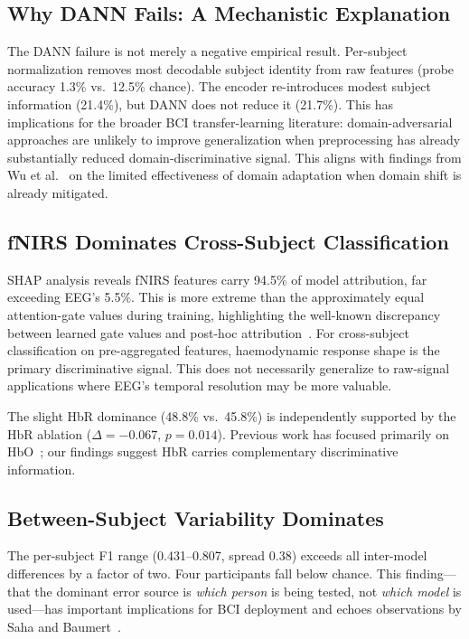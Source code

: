 \documentclass[conference]{IEEEtran}
\begin{document}
\subsection{Why DANN Fails: A Mechanistic Explanation}
The DANN failure is not merely a negative empirical result. Per-subject normalization removes most decodable subject identity from raw features (probe accuracy 1.3\% vs.\ 12.5\% chance). The encoder re-introduces modest subject information (21.4\%), but DANN does not reduce it (21.7\%). This has implications for the broader BCI transfer-learning literature: domain-adversarial approaches are unlikely to improve generalization when preprocessing has already substantially reduced domain-discriminative signal. This aligns with findings from Wu et al.~\cite{wu2022transfer} on the limited effectiveness of domain adaptation when domain shift is already mitigated.

\subsection{fNIRS Dominates Cross-Subject Classification}
SHAP analysis reveals fNIRS features carry 94.5\% of model attribution, far exceeding EEG's 5.5\%. This is more extreme than the approximately equal attention-gate values during training, highlighting the well-known discrepancy between learned gate values and post-hoc attribution~\cite{lundberg2017unified}. For cross-subject classification on pre-aggregated features, haemodynamic response shape is the primary discriminative signal. This does not necessarily generalize to raw-signal applications where EEG's temporal resolution may be more valuable.

The slight HbR dominance (48.8\% vs.\ 45.8\%) is independently supported by the HbR ablation ($\Delta = -0.067$, $p = 0.014$). Previous work has focused primarily on HbO~\cite{ayaz2012optical, herff2014mental}; our findings suggest HbR carries complementary discriminative information.

\subsection{Between-Subject Variability Dominates}
The per-subject F1 range (0.431--0.807, spread 0.38) exceeds all inter-model differences by a factor of two. Four participants fall below chance. This finding---that the dominant error source is \emph{which person} is being tested, not \emph{which model} is used---has important implications for BCI deployment and echoes observations by Saha and Baumert~\cite{saha2020variability}.
\end{document}
